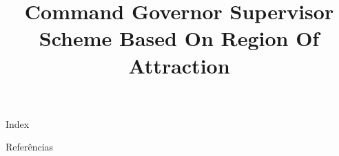 \documentclass[ieee,english]{slides}
\title{Command Governor Supervisor Scheme Based On Region Of Attraction}
\begin{document}
\maketitle{}

\begin{slide}{Index}
  \begin{minipage}[t][0.6\textheight][t]{0.5\textwidth}
    \tableofcontents[sections={1-3}]
  \end{minipage}
  \begin{minipage}[t][4\baselineskip][t]{0.5\textwidth}
    \tableofcontents[sections={4-}]
  \end{minipage}
  \vfill\null{}
\end{slide}






\begin{frame}[allowframebreaks]{Referências}
  \nocite{*}
  \printbibliography{}
\end{frame}
\end{document}
